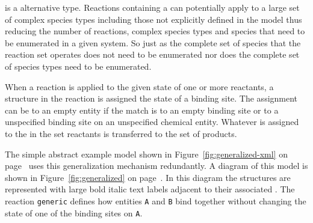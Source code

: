 \documentclass{cekarticle}
\begin{document}
 is a alternative  type.  Reactions
containing a  can potentially apply to a large
set of complex species types including those not explicitly
defined in the model thus reducing the number of reactions,
complex species types and species that need to be enumerated in a
given system.  So just as the complete set of species that the
reaction set operates does not need to be enumerated nor does the
complete set of species types need to be enumerated.

When a reaction is applied to the given state of one or more
reactants, a  structure in the reaction is
assigned the state of a binding site.  The assignment can be to an
empty entity if the match is to an empty binding site or to a
unspecified binding site on an unspecified chemical entity.
Whatever is assigned to the  in the set
reactants is transferred to the set of products.

The simple abstract example model shown in
Figure~\ref{fig:generalized-xml} on
page~\pageref{fig:generalized-xml} uses this generalization
mechanism redundantly. A diagram of this model is shown in
Figure~\ref{fig:generalized} on page~\pageref{fig:generalized}. In
this diagram the  structures are represented
with large bold italic text labels adjacent to their associated
. The reaction \texttt{generic} defines how
entities \texttt{A} and \texttt{B} bind together without changing
the state of one of the binding sites on \texttt{A}.
\end{document}
